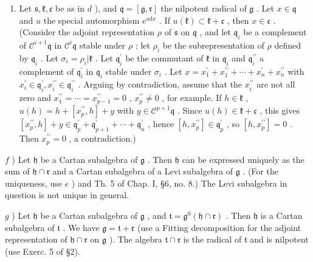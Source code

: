 \begin{enumerate}
\item
  Let \(\mathfrak{s},\mathfrak{k},\mathfrak{c}\) be as in \(d\) ), and \(\mathfrak{q}=[\mathfrak{g},\mathfrak{r}]\) the nilpotent radical of \(\mathfrak{g}\) . Let \(x\in\mathfrak{q}\) and \(u\) the special automorphism \(e^{\mathrm{ad}x}\) . If \(u(\mathfrak{k})\subset\mathfrak{k}+\mathfrak{c}\) , then \(x\in\mathfrak{c}\) . (Consider the adjoint representation \(\rho\) of \(\mathfrak{s}\) on \(\mathfrak{q}\) , and let \(\mathfrak{q}_{i}\) be a complement of \(\mathcal{C}^{i+1}\mathfrak{q}\) in \(\mathcal{C}^{i}\mathfrak{q}\) stable under \(\rho\) ; let \(\rho_{i}\) be the subrepresentation of \(\rho\) defined by \(\mathfrak{q}_{i}\) . Let \(\sigma_{i}=\rho_{i}|\mathfrak{k}\) . Let \(\mathfrak{q}_{i}^{\prime}\) be the commutant of \(\mathfrak{k}\) in \(\mathfrak{q}_{i}\) and \(\mathfrak{q}_{i}^{\prime\prime}\) a complement of \(\mathfrak{q}_{i}^{\prime}\) in \(\mathfrak{q}_{i}\) stable under \(\sigma_{i}\) . Let \(x=x_{1}^{\prime}+x_{1}^{\prime\prime}+\cdots+x_{n}^{\prime}+x_{n}^{\prime\prime}\) with \(x_{i}^{\prime}\in\mathfrak{q}_{i}^{\prime},x_{i}^{\prime\prime}\in\mathfrak{q}_{i}^{\prime\prime}\) . Arguing by contradiction, assume that the \(x_{i}^{\prime\prime}\) are not all zero and \(x_{1}^{\prime\prime}=\cdots=x_{p-1}^{\prime\prime}=0\) , \(x_{p}^{\prime\prime}\neq0\) , for example. If \(h\in\mathfrak{k}\) , \(u(h)=h+[x_{p}^{\prime\prime},h]+y\) with \(y\in\mathcal{C}^{p+1}\mathfrak{q}\) . Since \(u(h)\in\mathfrak{k}+\mathfrak{c}\) , this gives \([x_{p}^{\prime\prime},h]+y\in\mathfrak{q}_{p}^{\prime}+\mathfrak{q}_{p+1}^{\prime}+\cdots+\mathfrak{q}_{n}^{\prime}\) , hence \([h,x_{p}^{\prime\prime}]\in\mathfrak{q}_{p}^{\prime}\) , so \([h,x_{p}^{\prime\prime}]=0\) . Then \(x_{p}^{\prime\prime}=0\) , a contradiction.)
\end{enumerate}

\(f\) ) Let \(\mathfrak{h}\) be a Cartan subalgebra of \(\mathfrak{g}\) . Then \(\mathfrak{h}\) can be expressed uniquely as the sum of \(\mathfrak{h} \cap \mathfrak{r}\) and a Cartan subalgebra of a Levi subalgebra of \(\mathfrak{g}\) . (For the uniqueness, use \(e\) ) and Th. 5 of Chap. I, §6, no. 8.) The Levi subalgebra in question is not unique in general.

\(g\) ) Let \(\mathfrak{h}\) be a Cartan subalgebra of \(\mathfrak{g}\) , and \(\mathfrak{t} = \mathfrak{g}^0 (\mathfrak{h} \cap \mathfrak{r})\) . Then \(\mathfrak{h}\) is a Cartan subalgebra of \(\mathfrak{t}\) . We have \(\mathfrak{g} = \mathfrak{t} + \mathfrak{r}\) (use a Fitting decomposition for the adjoint representation of \(\mathfrak{h} \cap \mathfrak{r}\) on \(\mathfrak{g}\) ). The algebra \(\mathfrak{t} \cap \mathfrak{r}\) is the radical of \(\mathfrak{t}\) and is nilpotent (use Exerc. 5 of §2).

